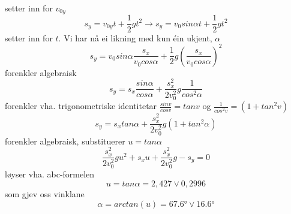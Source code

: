\documentclass[12pt,a4paper]{article}
\begin{document}
      setter inn for $v_{0y}$
      \begin{equation}
        s_y = v_{0y}t + \frac{1}{2}gt^2
        \rightarrow s_y = v_0sin\alpha t + \frac{1}{2}gt^2
      \end{equation}
      setter inn for $t$. Vi har nå ei likning med kun éin ukjent, $\alpha$
      \begin{equation}
        s_y = v_{0}sin\alpha \frac{s_x}{v_0 cos\alpha} +
        \frac{1}{2}g\left( \frac{s_x}{v_0 cos\alpha}\right)^2
      \end{equation}
      forenkler algebraisk
      \begin{equation}
        s_y = s_x\frac{sin\alpha}{cos\alpha} +
        \frac{s_x^2}{2v_0^2}g\frac{1}{cos^2\alpha}
      \end{equation}
      forenkler vha. trigonometriske identitetar $\frac{sinv}{cosv} = tanv$ og 
      $\frac{1}{cos^2v} = (1 + tan^2v)$
      \begin{equation}
        s_y = s_xtan\alpha +
        \frac{s_x^2}{2v_0^2}g\left( 1 + tan^2\alpha \right)
      \end{equation}
      forenkler algebraisk, substituerer $u = tan\alpha$
      \begin{equation}
        \frac{s_x^2}{2v_0^2}gu^2 + s_xu + 
        \frac{s_x^2}{2v_0^2}g - s_y = 0
      \end{equation}
      løyser vha. abc-formelen
      \begin{equation}
        u = tan\alpha = 2,427 \vee 0,2996
      \end{equation}
      som gjev oss vinklane
      \begin{equation}
        \alpha = arctan(u) = \ang{67,6} \vee \ang{16,6}
      \end{equation}
\end{document}
